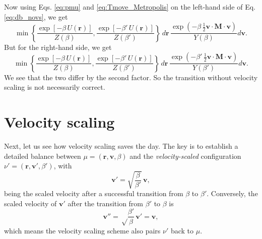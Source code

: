 \documentclass[11pt]{article}
\begin{document}
Now using Eqs. \eqref{eq:pmu} and \eqref{eq:Tmove_Metropolis}
on the left-hand side of Eq. \eqref{eq:db_novs}, we get
%
\begin{equation}
  \min\left\{
    \frac{
      \exp\left[ -\beta \, U(\mathbf r) \right]
    }
    {
      Z(\beta)
    }
    ,
    \frac{
      \exp\left[ -\beta' \, U(\mathbf r) \right]
    }
    {
      Z(\beta')
    }
  \right\}
  \, d \mathbf r \,
  \frac{
    \exp\left(
      -\beta \, \frac{1}{2} \mathbf v \cdot \mathbf M \cdot \mathbf v
    \right)
  }
  {
    Y(\beta)
  }
  d \mathbf v
  .
\label{eq:pflow_left}
\end{equation}
%
But for the right-hand side, we get
%
\begin{equation}
  \min\left\{
    \frac{
      \exp\left[ -\beta \, U(\mathbf r) \right]
    }
    {
      Z(\beta)
    }
    ,
    \frac{
      \exp\left[ -\beta' \, U(\mathbf r) \right]
    }
    {
      Z(\beta')
    }
  \right\}
  \, d \mathbf r \,
  \frac{
    \exp\left(
      -\beta' \, \frac{1}{2} \mathbf v \cdot \mathbf M \cdot \mathbf v
    \right)
  }
  {
    Y(\beta')
  }
  d \mathbf v
  .
\label{eq:pflow_left}
\end{equation}
%
We see that the two differ by the second factor.
%
So the transition without velocity scaling is
not necessarily correct.


\section{Velocity scaling}

Next, let us see how velocity scaling saves the day.
%
The key is to establish a detailed balance
between $\mu = (\mathbf r, \mathbf v, \beta)$
and the \emph{velocity-scaled} configuration
$\nu' = (\mathbf r, \mathbf v', \beta')$,
with
%
\begin{equation}
  \mathbf v'
  =
  \sqrt{ \frac{ \beta } { \beta' } }
  \, \mathbf v
  ,
\label{eq:vscale}
\end{equation}
%
being the scaled velocity after a successful transition
from $\beta$ to $\beta'$.
%
Conversely, the scaled velocity of $\mathbf v'$
after the transition from $\beta'$ to $\beta$ is
$$
  \mathbf v''
  =
  \sqrt \frac{ \beta' } { \beta } \,
  \mathbf v'
  =
  \mathbf v,
$$
which means the velocity scaling scheme also pairs
$\nu'$ back to $\mu$.
\end{document}
